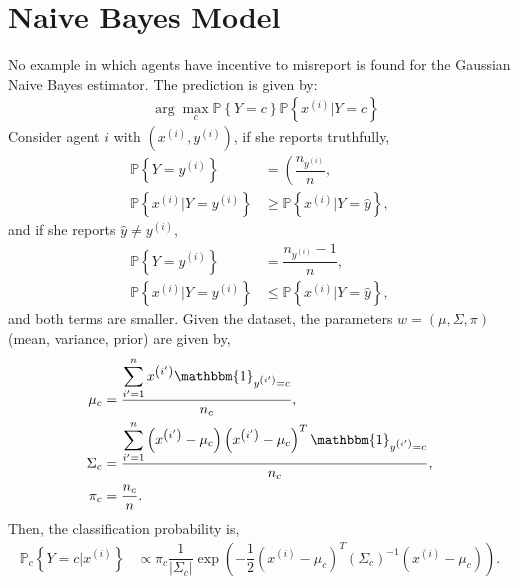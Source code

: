 \documentclass{article}
\begin{document}
\section{Naive Bayes Model} 
No example in which agents have incentive to misreport is found for the Gaussian Naive Bayes estimator.
\newline \newline
The prediction is given by:
\begin{align*}
&\arg\displaystyle\max_{c} \mathbb{P} \left\{Y = c\right\} \mathbb{P} \left\{x^{\left(i\right)} | Y = c\right\}
\end{align*}
Consider agent $i $ with $\left(x^{\left(i\right)}, y^{\left(i\right)}\right)$, if she reports truthfully,
\begin{align*}
\mathbb{P} \left\{Y = y^{\left(i\right)}\right\} &= \left(\dfrac{n_{y^{\left(i\right)}}}{n},\right.
\\ \mathbb{P} \left\{x^{\left(i\right)} | Y = y^{\left(i\right)}\right\} &\geq  \mathbb{P} \left\{x^{\left(i\right)} | Y = \hat{y}\right\},
\end{align*}
and if she reports $\hat{y} \neq  y^{\left(i\right)}$,
\begin{align*}
\mathbb{P} \left\{Y = y^{\left(i\right)}\right\} &= \dfrac{n_{y^{\left(i\right)}} - 1}{n},
\\ \mathbb{P} \left\{x^{\left(i\right)} | Y = y^{\left(i\right)}\right\} &\leq  \mathbb{P} \left\{x^{\left(i\right)} | Y = \hat{y}\right\},
\end{align*}
and both terms are smaller.
\newline \newline
Given the dataset, the parameters $w  = \left(\mu, \Sigma, \pi\right)$ (mean, variance, prior) are given by,
\begin{align*}
\mu_{c} &= \dfrac{\displaystyle\sum_{i'=1}^{n} x^{\left(i'\right)} \mathbbm{1}_{y^{\left(i'\right)} = c}}{n_{c}},
\\ \Sigma_{c} &= \dfrac{\displaystyle\sum_{i'=1}^{n} \left(x^{\left(i'\right)} - \mu_{c}\right) \left(x^{\left(i'\right)} - \mu_{c}\right)^{T} \mathbbm{1}_{y^{\left(i'\right)} = c}}{n_{c}},
\\ \pi_{c} &= \dfrac{n_{c}}{n} .
\end{align*}
Then, the classification probability is,
\begin{align*}
\mathbb{P}_{c} \left\{Y = c | x^{\left(i\right)}\right\} &\propto \pi_{c} \dfrac{1}{\left| \Sigma_{c} \right|} \exp\left(- \dfrac{1}{2} \left(x^{\left(i\right)} - \mu_{c}\right)^{T} \left(\Sigma_{c}\right)^{-1} \left(x^{\left(i\right)} - \mu_{c}\right)\right).
\end{align*}
\end{document}
